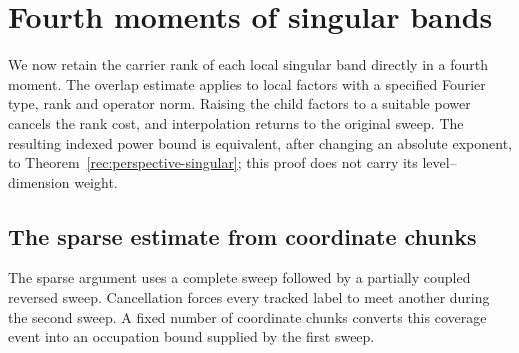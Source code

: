 \section{Fourth moments of singular bands}
\label{rec:sec-bands}
\label{sec:band-grid}

We now retain the carrier rank of each local singular band directly
in a fourth moment. The overlap estimate applies to local factors
with a specified Fourier type, rank and operator norm. Raising the
child factors to a suitable power cancels the rank cost, and
interpolation returns to the original sweep. The resulting indexed
power bound is equivalent, after changing an absolute exponent, to
Theorem~\ref{rec:perspective-singular}; this proof does not carry its
level--dimension weight.

\subsection{The sparse estimate from coordinate chunks}

The sparse argument uses a complete sweep followed by a partially
coupled reversed sweep. Cancellation forces every tracked label to
meet another during the second sweep. A fixed number of coordinate
chunks converts this coverage event into an occupation bound supplied
by the first sweep.

